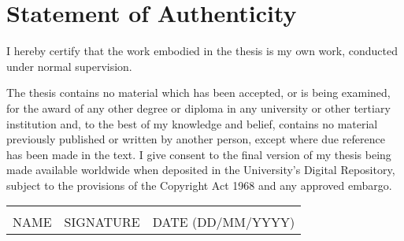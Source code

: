 \chapter*{Statement of Authenticity}

I hereby certify that the work embodied in the thesis is my own work, conducted under normal supervision.

The thesis contains no material which has been accepted, or is being examined, for the award of any other
degree or diploma in any university or other tertiary institution and, to the best of my knowledge and
belief, contains no material previously published or written by another person, except where due reference
has been made in the text. I give consent to the final version of my thesis being made available worldwide
when deposited in the University's Digital Repository, subject to the provisions of the Copyright Act 1968
and any approved embargo.

\vspace*{1cm}

\begin{center}
\footnotesize
\begin{tabular}{l l l}
	\makebox[0.3\linewidth]{\hrulefill}&\makebox[0.3\linewidth]{\hrulefill}&\makebox[0.3\linewidth]{\hrulefill}\\
		NAME                           & SIGNATURE                         & DATE (DD/MM/YYYY)
\end{tabular}
\end{center}
